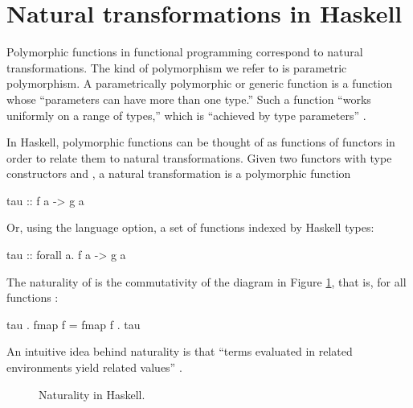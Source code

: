 \section{Natural transformations in Haskell}
\label{sec:naturals-haskell}

Polymorphic functions in functional programming correspond to natural
transformations. The kind of polymorphism we refer to is parametric
polymorphism. A parametrically polymorphic or generic function is a
function whose ``parameters can have more than one type.'' Such a
function ``works uniformly on a range of types,'' which is ``achieved
by type parameters'' \parencite[476]{cardelli-wegner-1985}.

In Haskell, polymorphic functions can be thought of as functions of
functors in order to relate them to natural transformations. Given two
functors with type constructors  and , a
natural transformation  is a polymorphic function
\begin{codehaskell}
tau :: f a -> g a
\end{codehaskell}
Or, using the  language option, a set of
functions indexed by Haskell types:
\begin{codehaskell}
tau :: forall a. f a -> g a
\end{codehaskell}
The naturality of  is the commutativity of the
diagram in Figure \ref{fig:naturality-haskell}, that is, for all
functions :
\begin{codehaskell}
tau . fmap f = fmap f . tau
\end{codehaskell}
An intuitive idea behind naturality is that ``terms evaluated in
related environments yield related values''
\parencite[347]{wadler-1989}.

\begin{figure}[htb]
  \begin{center}
  \end{center}
  \caption{Naturality in Haskell.}
  \label{fig:naturality-haskell}
\end{figure}

